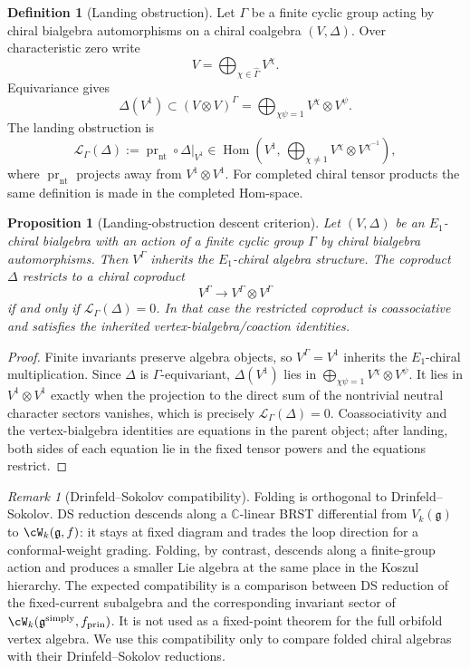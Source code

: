 \documentclass[11pt]{amsart}
\newtheorem{proposition}[theorem]{Proposition}
\theoremstyle{definition}
\newtheorem{definition}[theorem]{Definition}
\theoremstyle{remark}
\newtheorem{remark}[theorem]{Remark}
\providecommand{\fg}{\mathfrak{g}}
\begin{document}
\begin{definition}[Landing obstruction]
\label{def:landing-obstruction}
Let $\Gamma$ be a finite cyclic group acting by chiral bialgebra
automorphisms on a chiral coalgebra $(V,\Delta)$. Over characteristic
zero write
\[
  V=\bigoplus_{\chi\in\widehat{\Gamma}} V^\chi .
\]
Equivariance gives
\[
  \Delta(V^1)
  \subset
  (V\otimes V)^\Gamma
  =
  \bigoplus_{\chi\psi=1} V^\chi\otimes V^\psi .
\]
The landing obstruction is
\[
  \mathcal L_\Gamma(\Delta)
  :=
  \operatorname{pr}_{\mathrm{nt}}\circ \Delta|_{V^1}
  \in
  \operatorname{Hom}\!\left(
    V^1,\,
    \bigoplus_{\chi\ne 1}V^\chi\otimes V^{\chi^{-1}}
  \right),
\]
where $\operatorname{pr}_{\mathrm{nt}}$ projects away from
$V^1\otimes V^1$. For completed chiral tensor products the same
definition is made in the completed Hom-space.
\end{definition}

\begin{proposition}[Landing-obstruction descent criterion]
\label{prop:landing-obstruction-criterion}
Let $(V,\Delta)$ be an $E_1$-chiral bialgebra with an action of a
finite cyclic group $\Gamma$ by chiral bialgebra automorphisms. Then
$V^\Gamma$ inherits the $E_1$-chiral algebra structure. The coproduct
$\Delta$ restricts to a chiral coproduct
\[
  V^\Gamma \longrightarrow V^\Gamma\otimes V^\Gamma
\]
if and only if $\mathcal L_\Gamma(\Delta)=0$. In that case the
restricted coproduct is coassociative and satisfies the inherited
vertex-bialgebra/coaction identities.
\end{proposition}

\begin{proof}
Finite invariants preserve algebra objects, so $V^\Gamma=V^1$ inherits
the $E_1$-chiral multiplication. Since $\Delta$ is
$\Gamma$-equivariant,
$\Delta(V^1)$ lies in
$\bigoplus_{\chi\psi=1}V^\chi\otimes V^\psi$. It lies in
$V^1\otimes V^1$ exactly when the projection to the direct sum of the
nontrivial neutral character sectors vanishes, which is precisely
$\mathcal L_\Gamma(\Delta)=0$. Coassociativity and the
vertex-bialgebra identities are equations in the parent object; after
landing, both sides of each equation lie in the fixed tensor powers and
the equations restrict.
\end{proof}

\begin{remark}[Drinfeld--Sokolov compatibility]
\label{rem:folding-vs-ds}
Folding is orthogonal to Drinfeld--Sokolov. DS
reduction descends along a $\mathbb{C}$-linear BRST differential from
$V_k(\fg)$ to $\cW_k(\fg, f)$: it stays at fixed diagram and
trades the loop direction for a conformal-weight grading. Folding, by
contrast, descends along a finite-group action and produces a
smaller Lie algebra at the same place in the Koszul hierarchy. The
expected compatibility is a comparison between DS reduction of the
fixed-current subalgebra and the corresponding invariant sector of
$\cW_k(\fg^{\mathrm{simply}}, f_{\mathrm{prin}})$. It is not used as
a fixed-point theorem for the full orbifold vertex algebra. We use
this compatibility only to compare folded chiral algebras with their
Drinfeld--Sokolov reductions.
\end{remark}
\end{document}
